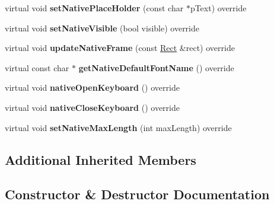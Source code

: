 \begin{DoxyCompactItemize}
\item 
\mbox{\label{classui_1_1EditBoxImplWin_ace7b715645d407a6b40a2cc68fc983e6}} 
virtual void {\bfseries set\+Native\+Place\+Holder} (const char $\ast$p\+Text) override
\item 
\mbox{\label{classui_1_1EditBoxImplWin_ab186b04cc6f5e69c554ea8682953b418}} 
virtual void {\bfseries set\+Native\+Visible} (bool visible) override
\item 
\mbox{\label{classui_1_1EditBoxImplWin_abf6c3970f10c2143d8c574c727bcc91b}} 
virtual void {\bfseries update\+Native\+Frame} (const \hyperlink{classRect}{Rect} \&rect) override
\item 
\mbox{\label{classui_1_1EditBoxImplWin_a55f98f3176c3daf5ba40456f31b88af4}} 
virtual const char $\ast$ {\bfseries get\+Native\+Default\+Font\+Name} () override
\item 
\mbox{\label{classui_1_1EditBoxImplWin_a8414e5920ad76c2a3be959aac079bdc0}} 
virtual void {\bfseries native\+Open\+Keyboard} () override
\item 
\mbox{\label{classui_1_1EditBoxImplWin_a3bcc5e45ec40f412085247fd8f8d0064}} 
virtual void {\bfseries native\+Close\+Keyboard} () override
\item 
\mbox{\label{classui_1_1EditBoxImplWin_a9955422b90a12c9d22071e339e74e71c}} 
virtual void {\bfseries set\+Native\+Max\+Length} (int max\+Length) override
\end{DoxyCompactItemize}
\subsection*{Additional Inherited Members}


\subsection{Constructor \& Destructor Documentation}
\mbox{\label{classui_1_1EditBoxImplWin_aed994ecac4c5fc87fd736bc12b6f0e8d}} 
